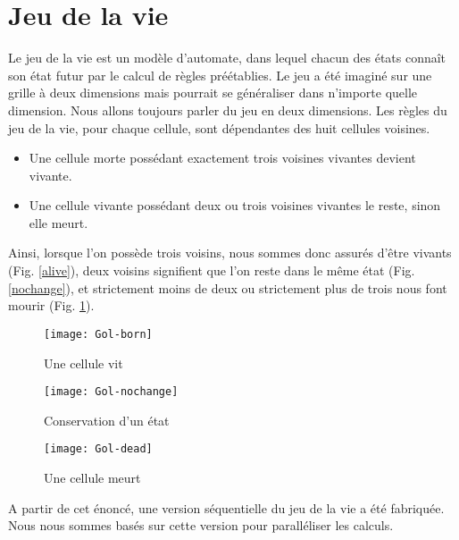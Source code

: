 \section{Jeu de la vie} %
\label{sec:jeu_de_la_vie}

Le jeu de la vie est un modèle d'automate, dans lequel chacun des états connaît son état futur par le calcul de règles préétablies. Le jeu a été imaginé sur une grille à deux dimensions mais pourrait se généraliser dans n'importe quelle dimension. Nous allons toujours parler du jeu en deux dimensions. Les règles du jeu de la vie, pour chaque cellule, sont dépendantes des huit cellules voisines.
\begin{itemize}
\item Une cellule morte possédant exactement trois voisines vivantes devient vivante.
\item Une cellule vivante possédant deux ou trois voisines vivantes le reste, sinon elle meurt.
\end{itemize}

Ainsi, lorsque l'on possède trois voisins, nous sommes donc assurés d'être vivants (Fig. \ref{alive}), deux voisins signifient que l'on reste dans le même état (Fig. \ref{nochange}), et strictement moins de deux ou strictement plus de trois nous font mourir (Fig. \ref{dead}).

\begin{figure}[!ht]
\centering
\begin{minipage}{.3\textwidth}
\centering
\texttt{[image: Gol-born]}
\caption{Une cellule vit}
\label{alive}
\end{minipage}
\hspace{0.5cm}
\begin{minipage}{0.3\textwidth}
\centering
\texttt{[image: Gol-nochange]}
\caption{Conservation d'un état}
\label{nochange}
\end{minipage}
\hspace{0.5cm}
\begin{minipage}{.3\textwidth}
\centering
\texttt{[image: Gol-dead]}
\caption{Une cellule meurt}
\label{dead}
\end{minipage}
\end{figure}


A partir de cet énoncé, une version séquentielle du jeu de la vie a été fabriquée. Nous nous sommes basés sur cette version pour paralléliser les calculs.